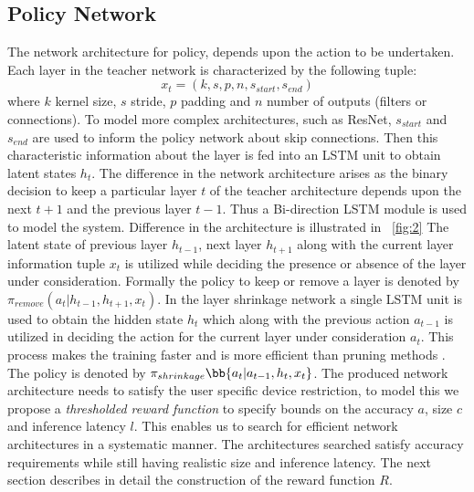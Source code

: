 \documentclass[../main]{subfiles}
\begin{document}
\subsection{Policy Network}
	\label{sssec:num1}
The network architecture for policy, depends upon the action to be undertaken.
Each layer in the teacher network is characterized by the following tuple:
\begin{equation}
    x_{t} = (k, s, p, n, s_{start}, s_{end})
\end{equation}
where $k$ kernel size, $s$ stride, $p$ padding and $n$ number of outputs (filters or connections).
To model more complex architectures, such as ResNet, $s_{start}$ and $s_{end}$ are used to inform the policy network about skip connections.
Then this characteristic information about the layer is fed into an LSTM unit to obtain latent states $h_{t}$.
The difference in the network architecture arises as the binary decision to keep a particular layer $t$ of the teacher architecture depends upon the next $t+1$ and the previous layer $t-1$.
Thus a Bi-direction LSTM module is used to model the system.
Difference in the architecture is illustrated in \figurename~\ref{fig:2}
The latent state of previous layer $h_{t-1}$, next layer $h_{t+1}$ along with the current layer information tuple $x_{t}$ is utilized while deciding the presence or absence of the layer under consideration.
Formally the policy to keep or remove a layer is denoted by $\pi_{remove}(a_{t}|h_{t-1}, h_{t+1}, x_{t})$.
In the layer shrinkage network a single LSTM unit is used to obtain the hidden state $h_{t}$ which along with the previous action $a_{t-1}$ is utilized in deciding the action for the current layer under consideration $a_{t}$.
This process makes the training faster and is more efficient than pruning methods \citep{srinivas2015data,guo2016dynamic,anwar2017structured}.
The policy is denoted by $\pi_{shrinkage}\bb{a_{t}|a_{t-1}, h_{t}, x_{t}}$.
The produced network architecture needs to satisfy the user specific device restriction, to model this we propose a \textit{thresholded reward function} to specify bounds on the accuracy $a$, size $c$ and inference latency $l$.
This enables us to search for efficient network architectures in a systematic manner.
The architectures searched satisfy accuracy requirements while still having realistic size and inference latency.
The next section describes in detail the construction of the reward function $R$.
\end{document}
